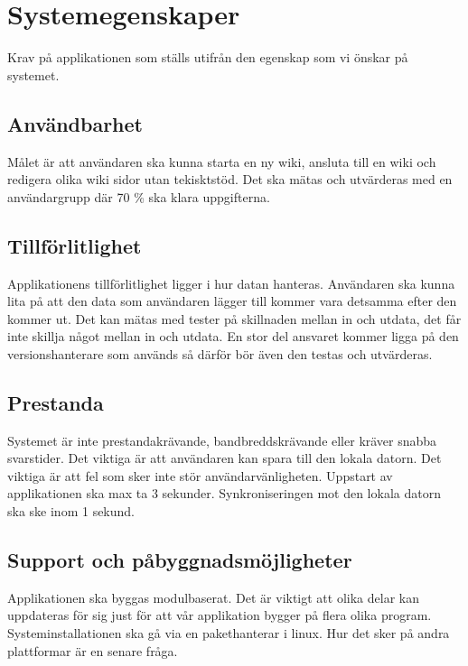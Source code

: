 \section{Systemegenskaper}
Krav på applikationen som ställs utifrån den egenskap som vi önskar på systemet. 

\subsection{Användbarhet}
Målet är att användaren ska kunna starta en ny wiki, ansluta till en wiki och redigera olika wiki sidor utan tekisktstöd. Det ska mätas och utvärderas med en användargrupp där 70 \% ska klara uppgifterna. 

\subsection{Tillförlitlighet} 
Applikationens tillförlitlighet ligger i hur datan hanteras. Användaren ska kunna lita på att den data som användaren lägger till kommer vara detsamma efter den kommer ut. Det kan mätas med tester på skillnaden mellan in och utdata, det får inte skillja något mellan in och utdata. En stor del ansvaret kommer ligga på den versionshanterare som används så därför bör även den testas och utvärderas. 

\subsection{Prestanda}
Systemet är inte prestandakrävande, bandbreddskrävande eller kräver snabba svarstider. Det viktiga är att användaren kan spara till den lokala datorn. Det viktiga är att fel som sker inte stör användarvänligheten. Uppstart av applikationen ska max ta 3 sekunder. Synkroniseringen mot den lokala datorn ska ske inom 1 sekund. 

\subsection{Support och påbyggnadsmöjligheter} 
Applikationen ska byggas modulbaserat. Det är viktigt att olika delar kan uppdateras för sig just för att vår applikation bygger på flera olika program. Systeminstallationen ska gå via en pakethanterar i linux.  Hur det sker på andra plattformar är en senare fråga.


